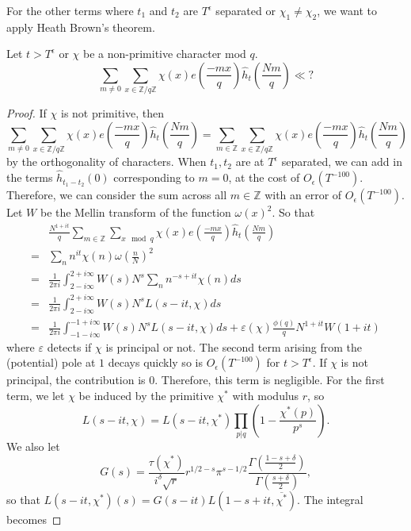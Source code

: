 For the other terms where $t_1$ and $t_2$ are $T^\epsilon$ separated or $\chi_1\neq \chi_2$, we want to apply Heath Brown's theorem. 
\begin{lemma}
    Let $t>T^\epsilon$ or $\chi$ be a non-primitive character mod $q$.
    \[
        \sum_{m\neq 0} \sum_{x \in \mathbb{Z}/q\mathbb{Z}}\chi(x) e\left(\frac{-mx}{q}\right)
        \hat{h}_{t}\left(\frac{Nm}{q}\right)\ll ?
    \]
\end{lemma}
\begin{proof}
    If $\chi$ is not primitive, then \[
        \sum_{m\neq 0} \sum_{x \in \mathbb{Z}/q\mathbb{Z}}\chi(x) e\left(\frac{-mx}{q}\right)
        \hat{h}_{t}\left(\frac{Nm}{q}\right)=\sum_{m\in \mathbb{Z}} \sum_{x \in \mathbb{Z}/q\mathbb{Z}}\chi(x) e\left(\frac{-mx}{q}\right)
        \hat{h}_{t}\left(\frac{Nm}{q}\right)
    \] by the orthogonality of characters.
    When $t_1,t_2$ are at $T^\epsilon$ separated, we can add in the terms $\hat{h}_{t_1-t_2}(0)$ corresponding to $m=0$, at the cost of $O_\epsilon(T^{-100})$. Therefore, we can consider the sum across all $m\in\mathbb{Z}$ with an error of $O_\epsilon(T^{-100})$. Let $W$ be the Mellin transform of the function $\omega(x)^2$. So that
\begin{align*}
    &\frac{N^{1+it}}{q}\sum_{m\in \mathbb{Z}} \sum_{x \mod q}\chi(x) e\left(\frac{-mx}{q}\right)
    \hat{h}_{t}\left(\frac{Nm}{q}\right) \\
    =& \sum_{n} n^{it}\chi(n)\omega\left(\frac{n}{N}\right)^2\\
    =& \frac{1}{2\pi i}\int_{2-i\infty}^{2+i\infty}W(s)N^s \sum_n n^{-s+it}\chi(n) ds\\
    =& \frac{1}{2\pi i}\int_{2-i\infty}^{2+i\infty}W(s)N^s L(s-it,\chi) ds\\
    =& \frac{1}{2\pi i}\int_{-1-i\infty}^{-1+i\infty}W(s)N^sL(s-it,\chi) ds + \varepsilon(\chi)\frac{\phi(q)}{q}N^{1+it}W(1+it)
\end{align*}
where $\varepsilon$ detects if $\chi$ is principal or not. The second term arising from the (potential) pole at $1$ decays quickly so is $O_{\epsilon}(T^{-100})$ for $t>T^\epsilon$. If $\chi$ is not principal, the contribution is $0$. Therefore, this term is negligible. 
For the first term, we let $\chi$ be induced by the primitive $\chi^*$ with modulus $r$, so\[
    L(s-it,\chi)=L(s-it,\chi^*)\prod_{p|q} \left(1-\frac{\chi^*(p)}{p^s}\right).
\]
We also let \[
    G(s) =\frac{\tau(\chi^*)}{i^\delta\sqrt{r}}r^{1/2-s}\pi^{s-1/2}\frac{\Gamma(\frac{1-s+\delta}{2})}{\Gamma(\frac{s+\delta}{2})},
\]
so that $L(s-it,\chi^*)(s) = G(s-it)L(1-s+it,\overline{\chi^*})$. The integral becomes

\end{proof}
